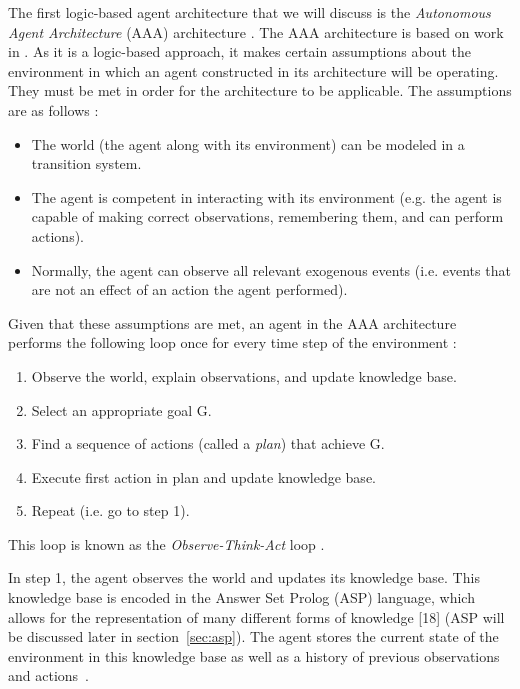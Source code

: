 The first logic-based agent architecture that we will discuss is the \textit{Autonomous Agent Architecture} (AAA) architecture \cite{balduccini_aaa_2008}.
The AAA architecture is based on work in \cite{baral_reasoning_2000,balduccini_diagnostic_2003, balduccini_answer_2006,balduccini_learning_2007}.
As it is a logic-based approach, it makes certain assumptions about the environment in which an agent constructed in its architecture will be operating.
They must be met in order for the architecture to be applicable.
The assumptions are as follows \cite{balduccini_aaa_2008}:

\begin{itemize}
    \item The world (the agent along with its environment) can be modeled in a transition system.
    \item The agent is competent in interacting with its environment (e.g. the agent is capable of making correct observations, remembering them, and can perform actions).
    \item Normally, the agent can observe all relevant exogenous events (i.e. events that are not an effect of an action the agent performed).
\end{itemize}

Given that these assumptions are met, an agent in the AAA architecture performs the following loop once for every time step of the environment \cite{balduccini_aaa_2008}:

\begin{enumerate}
    \item Observe the world, explain observations, and update knowledge base.
    \item Select an appropriate goal G.
    \item Find a sequence of actions (called a \textit{plan}) that achieve G.
    \item Execute first action in plan and update knowledge base.
    \item Repeat (i.e. go to step 1).
\end{enumerate}

This loop is known as the \textit{Observe-Think-Act} loop \cite{balduccini_aaa_2008}.

In step 1, the agent observes the world and updates its knowledge base.
This knowledge base is encoded in the Answer Set Prolog (ASP) language, which allows for the representation of many different forms of knowledge [18] (ASP will be discussed later in section~\ref{sec:asp}).
The agent stores the current state of the environment in this knowledge base as well as a history of previous observations and actions~\cite{balduccini_aaa_2008}.

